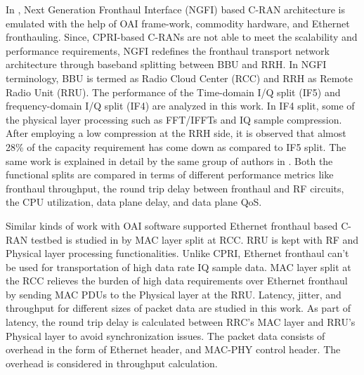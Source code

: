 \begin{multicols}{2}
\begin{itemize}
In \cite{art3-key74}, Next Generation Fronthaul Interface (NGFI) based C-RAN architecture is emulated with the help of OAI frame-work, commodity hardware, and Ethernet fronthauling. Since, CPRI-based C-RANs are not able to meet the scalability and performance requirements, NGFI redefines the fronthaul transport network architecture through baseband splitting between BBU and RRH. In NGFI terminology, BBU is termed as Radio Cloud Center (RCC) and RRH as Remote Radio Unit (RRU). The performance of the Time-domain I/Q split (IF5) and frequency-domain I/Q split (IF4) are analyzed in this work. In IF4 split, some of the physical layer processing such as FFT/IFFTs and IQ sample compression. After employing a low compression at the RRH side, it is observed that almost 28\% of the capacity requirement has come down as compared to IF5 split. The same work is explained in detail by the same group of authors in \cite{art3-key75}. Both the functional splits are compared in terms of different performance metrics like fronthaul throughput, the round trip delay between fronthaul and RF circuits, the CPU utilization, data plane delay, and data plane QoS.

Similar kinds of work with OAI software supported Ethernet fronthaul based C-RAN testbed is studied in \cite{art3-key76} by MAC layer split at RCC. RRU is kept with RF and Physical layer processing functionalities. Unlike CPRI, Ethernet fronthaul can’t be used for transportation of high data rate IQ sample data. MAC layer split at the RCC relieves the burden of high data requirements over Ethernet fronthaul by sending MAC PDUs to the Physical layer at the RRU. Latency, jitter, and throughput for different sizes of packet data are studied in this work. As part of latency, the round trip delay is calculated between RRC’s MAC layer and RRU’s Physical layer to avoid synchronization issues. The packet data consists of overhead in the form of Ethernet header, and MAC-PHY control header. The overhead is considered in throughput calculation. 


\end{itemize}
\end{multicols}
